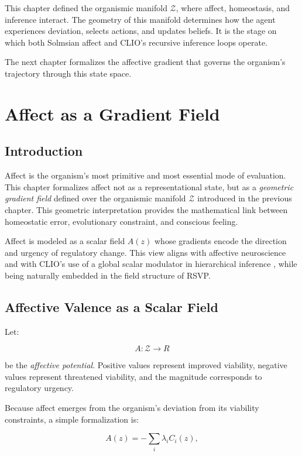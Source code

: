 \documentclass[12pt,oneside]{book}
\theoremstyle{plain}
\theoremstyle{definition}
\let\citep\parencite
\def\mathbb#1{#1}%
\begin{document}
This chapter defined the organismic manifold $\mathcal{Z}$,
where affect, homeostasis, and inference interact.
The geometry of this manifold determines how the agent experiences deviation,
selects actions, and updates beliefs.
It is the stage on which both Solmsian affect and CLIO’s recursive
inference loops operate.

The next chapter formalizes the affective gradient that governs the organism’s
trajectory through this state space.

\chapter{Affect as a Gradient Field}

\section{Introduction}

Affect is the organism’s most primitive and most essential mode of evaluation.
This chapter formalizes affect not as a representational state, but as a
\emph{geometric gradient field} defined over the organismic manifold
$\mathcal{Z}$ introduced in the previous chapter.
This geometric interpretation provides the mathematical link between
homeostatic error, evolutionary constraint, and conscious feeling.

Affect is modeled as a scalar field $A(z)$ whose gradients encode the direction
and urgency of regulatory change.
This view aligns with affective neuroscience
\citep{panksepp1998affective,solms2021hidden} and with CLIO’s use of a
global scalar modulator in hierarchical inference
\citep{cheng2025cognitive}, while being naturally embedded in the field
structure of RSVP.

\section{Affective Valence as a Scalar Field}

Let:

\[
A : \mathcal{Z} \rightarrow \mathbb{R}
\]

be the \emph{affective potential}.
Positive values represent improved viability, negative values represent
threatened viability, and the magnitude corresponds to regulatory urgency.

Because affect emerges from the organism’s deviation from its viability
constraints, a simple formalization is:

\[
A(z) = -\sum_{i} \lambda_i C_i(z),
\]
\end{document}

